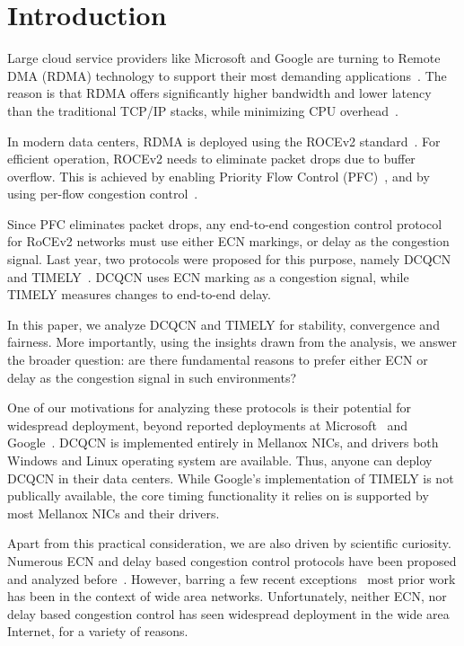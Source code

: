 \section{Introduction}

Large cloud service providers like Microsoft and Google are turning to Remote
DMA (RDMA) technology to support their most demanding
applications~\cite{dcqcn,timely,tcp-bolt,erasure-storage,farm,pilaf}.  The
reason is that RDMA offers significantly higher bandwidth and lower latency than
the traditional TCP/IP stacks, while minimizing CPU
overhead~\cite{dcqcn,farm,timely}. 


In modern data centers, RDMA is deployed using the ROCEv2 standard~\cite{rocev2}.
For efficient operation, ROCEv2 needs to eliminate packet drops due to buffer
overflow. This is achieved by enabling Priority Flow Control (PFC)~\cite{pfc},
and by using per-flow congestion control~\cite{dcqcn,timely}. 


Since PFC eliminates packet drops, any end-to-end congestion control protocol
for RoCEv2 networks must use either ECN markings, or delay as the congestion
signal. Last year, two protocols were proposed for this purpose, namely
DCQCN~\cite{dcqcn} and TIMELY~\cite{timely}. DCQCN uses ECN marking as a
congestion signal, while TIMELY measures changes to end-to-end delay.


In this paper, we analyze DCQCN and TIMELY for stability, convergence and
fairness. More importantly, using the insights drawn from the analysis, we
answer the broader question: are there fundamental reasons to prefer either ECN
or delay as the congestion signal in such environments?


One of our motivations for analyzing these protocols is their potential for
widespread deployment, beyond reported deployments at Microsoft~\cite{dcqcn} and
Google~\cite{timely}. DCQCN is implemented entirely in Mellanox NICs, and
drivers both Windows and Linux operating system are available. Thus, anyone can
deploy DCQCN in their data centers. While Google's implementation of TIMELY is
not publically available, the core timing functionality it relies on is
supported by most Mellanox NICs and their drivers.

Apart from this practical consideration, we are also driven by
scientific curiosity. Numerous ECN and delay based congestion control protocols
have been proposed and analyzed before~\cite{ecn, tcp-vegas,
Hollot:PIController,misra2000fluid,hollot2001designing,misra:TAC2002,gorinsky2004feedback}.
However, barring a few recent exceptions~\cite{dctcp-analysis, qcn-analysis}
most prior work has been in the context of wide area networks.  Unfortunately,
neither ECN, nor delay based congestion control has seen widespread
deployment in the wide area Internet, for a variety of reasons. 

